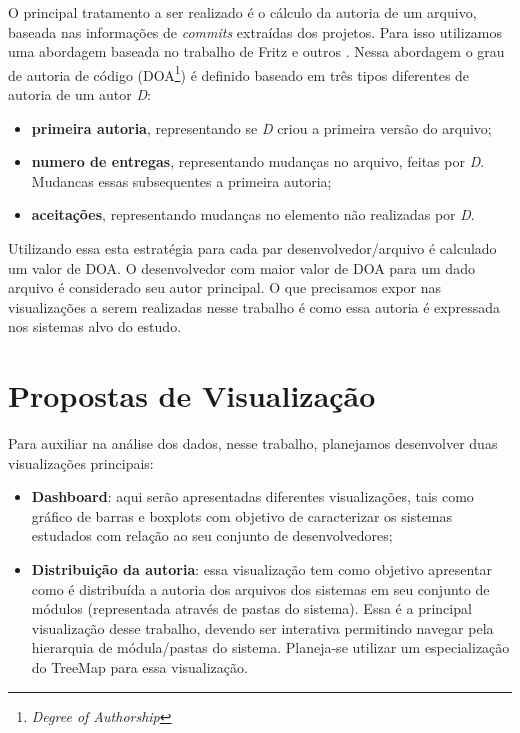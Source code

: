\documentclass[12pt]{article}
\begin{document}
O principal tratamento a ser realizado é o cálculo da autoria de um arquivo, baseada nas informações de \textit{commits} extraídas dos projetos. Para isso utilizamos uma abordagem baseada no trabalho de Fritz e outros \cite{Fritz2014}. Nessa abordagem o grau de autoria de código (DOA\footnote{\textit{Degree of Authorship}}) é definido baseado em três tipos diferentes de autoria de um autor \textit{D}:
\begin{itemize}
    \item \textbf{primeira autoria}, representando se \textit{D} criou a primeira versão do arquivo;
    \item \textbf{numero de entregas}, representando mudanças no arquivo, feitas por \textit{D}. Mudancas essas subsequentes a primeira autoria;
    \item \textbf{aceitações}, representando mudanças no elemento não realizadas por \textit{D}. 
\end{itemize}

Utilizando essa esta estratégia para cada par desenvolvedor/arquivo é calculado um valor de DOA. O desenvolvedor com maior valor de DOA para um dado arquivo é considerado seu autor principal. O que precisamos expor nas visualizações a serem realizadas nesse trabalho é como essa autoria é expressada nos sistemas alvo do estudo.

\section{Propostas de Visualização}

Para auxiliar na análise dos dados, nesse trabalho, planejamos desenvolver duas visualizações principais:
\begin{itemize}
    \item \textbf{Dashboard}: aqui serão apresentadas diferentes visualizações, tais como gráfico de barras e boxplots com objetivo de caracterizar os sistemas estudados com relação ao seu conjunto de desenvolvedores;
    \item \textbf{Distribuição da autoria}: essa visualização tem como objetivo apresentar como é distribuída a autoria dos arquivos dos sistemas em seu conjunto de módulos (representada através de pastas do sistema). Essa é a principal visualização desse trabalho, devendo ser interativa permitindo navegar pela hierarquia de módula/pastas do sistema. Planeja-se utilizar um especialização do TreeMap para essa visualização. 
\end{itemize}
\footnotesize


\end{document}
